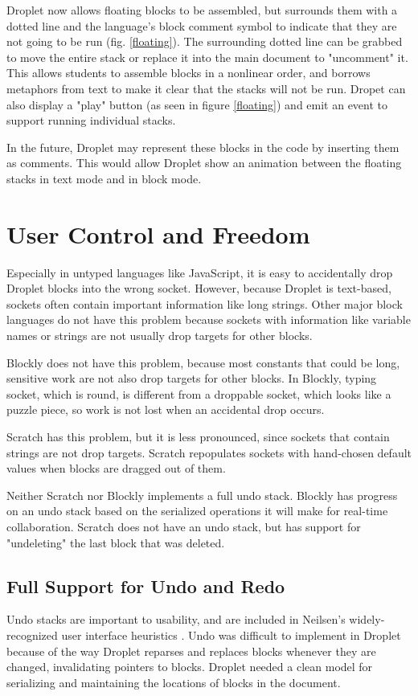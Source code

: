 \documentclass[conference]{IEEEtran}
\begin{document}
Droplet now allows floating blocks to be assembled, but surrounds them with a dotted line and the language's block comment symbol to indicate that they are not going to be run (fig. \ref{floating}). The surrounding dotted line can be grabbed to move the entire stack or replace it into the main document to "uncomment" it. This allows students to assemble blocks in a nonlinear order, and borrows metaphors from text to make it clear that the stacks will not be run. Dropet can also display a "play" button (as seen in figure \ref{floating}) and emit an event to support running individual stacks.

In the future, Droplet may represent these blocks in the code by inserting them as comments. This would allow Droplet show an animation between the floating stacks in text mode and in block mode.

\section{User Control and Freedom}

Especially in untyped languages like JavaScript, it is easy to accidentally drop Droplet blocks into the wrong socket. However, because Droplet is text-based, sockets often contain important information like long strings. Other major block languages do not have this problem because sockets with information like variable names or strings are not usually drop targets for other blocks.

Blockly does not have this problem, because most constants that could be long, sensitive work are not also drop targets for other blocks. In Blockly, typing socket, which is round, is different from a droppable socket, which looks like a puzzle piece, so work is not lost when an accidental drop occurs.

Scratch has this problem, but it is less pronounced, since sockets that contain strings are not drop targets. Scratch repopulates sockets with hand-chosen default values when blocks are dragged out of them.

Neither Scratch nor Blockly implements a full undo stack. Blockly has progress on an undo stack based on the serialized operations it will make for real-time collaboration. Scratch does not have an undo stack, but has support for "undeleting" the last block that was deleted.

\subsection{Full Support for Undo and Redo}
Undo stacks are important to usability, and are included in Neilsen's widely-recognized user interface heuristics \cite{Neilsen}. Undo was difficult to implement in Droplet because of the way Droplet reparses and replaces blocks whenever they are changed, invalidating pointers to blocks. Droplet needed a clean model for serializing and maintaining the locations of blocks in the document.
\end{document}
